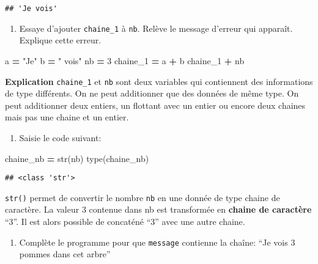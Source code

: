 \documentclass[
]{book}
\newenvironment{Shaded}{\begin{snugshade}}{\end{snugshade}}
\newcommand{\BuiltInTok}[1]{#1}
\newcommand{\DecValTok}[1]{\textcolor[rgb]{0.00,0.00,0.81}{#1}}
\newcommand{\NormalTok}[1]{#1}
\newcommand{\OperatorTok}[1]{\textcolor[rgb]{0.81,0.36,0.00}{\textbf{#1}}}
\newcommand{\StringTok}[1]{\textcolor[rgb]{0.31,0.60,0.02}{#1}}
\providecommand{\tightlist}{%
  \setlength{\itemsep}{0pt}\setlength{\parskip}{0pt}}
\def\tightlist{}
\begin{document}
\begin{verbatim}
## 'Je vois'
\end{verbatim}

\begin{enumerate}
\def\labelenumi{\arabic{enumi}.}
\setcounter{enumi}{3}
\tightlist
\item
  Essaye d'ajouter \texttt{chaine\_1} à \texttt{nb}. Relève le message d'erreur qui apparaît. Explique cette erreur.
\end{enumerate}

\begin{Shaded}
\begin{Highlighting}[]
\NormalTok{a }\OperatorTok{=} \StringTok{"Je"}
\NormalTok{b }\OperatorTok{=} \StringTok{" vois"}
\NormalTok{nb }\OperatorTok{=} \DecValTok{3}
\NormalTok{chaine\_1 }\OperatorTok{=}\NormalTok{ a }\OperatorTok{+}\NormalTok{ b}
\NormalTok{chaine\_1 }\OperatorTok{+}\NormalTok{ nb}
\end{Highlighting}
\end{Shaded}

\textbf{Explication} \texttt{chaine\_1} et \texttt{nb} sont deux variables qui contiennent des informations de type différents. On ne peut additionner que des données de même type. On peut additionner deux entiers, un flottant avec un entier ou encore deux chaines mais pas une chaine et un entier.

\begin{enumerate}
\def\labelenumi{\arabic{enumi}.}
\setcounter{enumi}{4}
\tightlist
\item
  Saisie le code suivant:
\end{enumerate}

\begin{Shaded}
\begin{Highlighting}[]
\NormalTok{chaine\_nb }\OperatorTok{=} \BuiltInTok{str}\NormalTok{(nb)}
\BuiltInTok{type}\NormalTok{(chaine\_nb)}
\end{Highlighting}
\end{Shaded}

\begin{verbatim}
## <class 'str'>
\end{verbatim}

\texttt{str()} permet de convertir le nombre \texttt{nb} en une donnée de type chaine de caractère. La valeur 3 contenue dans nb est transformée en \textbf{chaine de caractère} ``3''. Il est alors possible de concaténé ``3'' avec une autre chaine.

\begin{enumerate}
\def\labelenumi{\arabic{enumi}.}
\setcounter{enumi}{5}
\tightlist
\item
  Complète le programme pour que \texttt{message} contienne la chaîne: ``Je vois 3 pommes dans cet arbre''
\end{enumerate}
\end{document}

